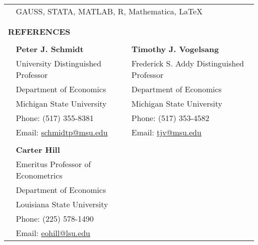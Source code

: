 \documentclass[10pt]{article}
\begin{document}
\begin{center}
\begin{tabular}{llllr}
&\multicolumn{4}{l}{GAUSS, STATA, MATLAB, R, Mathematica, \LaTeX}\\
%
\multicolumn{5}{l}{}\\\\
\multicolumn{5}{l}{{\Large \textbf{R}}\textbf{EFERENCES}}\\
\multicolumn{1}{p{20pt}}{}&\multicolumn{1}{p{130pt}}{}&\multicolumn{1}{p{70pt}}{}&\multicolumn{1}{p{130pt}}{}&\multicolumn{1}{p{110pt}}{}\\
\multicolumn{1}{p{10pt}}{}&\multicolumn{2}{l}{\textbf{Peter J. Schmidt}} & \multicolumn{2}{l}{\textbf{Timothy J. Vogelsang}} \\
&\multicolumn{2}{l}{University Distinguished Professor} &\multicolumn{2}{l}{Frederick S. Addy Distinguished Professor} \\
&\multicolumn{2}{l}{Department of Economics} &\multicolumn{2}{l}{Department of Economics} \\
&\multicolumn{2}{l}{Michigan State University} &\multicolumn{2}{l}{Michigan State University}\\
&\multicolumn{2}{l}{Phone: (517) 355-8381}&\multicolumn{2}{l}{Phone: (517) 353-4582} \\
&\multicolumn{2}{l}{Email:  \href{mailto:schmidtp@msu.edu}{schmidtp@msu.edu}}&\multicolumn{2}{l}{Email: \href{mailto:tjv@msu.edu}{tjv@msu.edu}}\\ 
\multicolumn{5}{l}{}\\
& \multicolumn{2}{l}{\textbf{Carter Hill}}&\multicolumn{2}{l}{}\\
&\multicolumn{2}{l}{Emeritus Professor of Econometrics}&\multicolumn{2}{l}{}\\
& \multicolumn{2}{l}{Department of Economics}&\multicolumn{2}{l}{}\\
&\multicolumn{2}{l}{Louisiana State University}&\multicolumn{2}{l}{}\\
&\multicolumn{2}{l}{Phone: (225) 578-1490}&\multicolumn{2}{l}{}\\
&\multicolumn{2}{l}{Email:  \href{mailto:eohill@lsu.edu}{eohill@lsu.edu}}&\multicolumn{2}{l}{}
\end{tabular}

\end{center}
\end{document}
